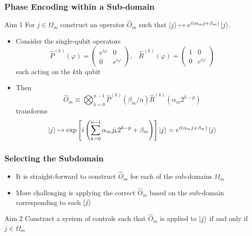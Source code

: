 \documentclass{beamer}
\begin{document}
\begin{frame}

\frametitle{Phase Encoding within a Sub-domain}

\begin{block}{Aim 1}
For $j \in \Omega_m$ construct an operator $\hat{O}_m$ such that $\ket{j} \mapsto e^{i (\alpha_m j + \beta_m )} \ket{j}$. 
\end{block}

\begin{itemize}
\item Consider the single-qubit operators 
\begin{equation}
\hat{P}^{(k)}(\varphi) = \begin{pmatrix}
e^{i \varphi} & 0 \\ 0 & e^{i \varphi}
\end{pmatrix}, \; \; \; \hat{R}^{(k)}(\varphi) = \begin{pmatrix}
1 & 0 \\ 0 & e^{i \varphi}
\end{pmatrix}
\end{equation}
each acting on the $k$th qubit
\item Then 
\begin{equation}
\hat{O}_m \equiv \bigotimes^{n-1}_{k=0} \hat{P}^{(k)} (\beta_m / n) \hat{R}^{(k)} \left( \alpha_m 2^{k-p} \right)
\end{equation}
transforms 
\begin{equation}
\ket{j} \mapsto \exp \left[ i \left( \sum_{k=0}^{n-1} \alpha_m j_k 2^{k-p} + \beta_m \right) \right] \ket{j} = e^{i (\alpha_m j + \beta_m )} \ket{j}
\end{equation}
\end{itemize}
\end{frame}

\begin{frame}
\frametitle{Selecting the Subdomain}
\begin{itemize}
\item It is straight-forward to construct $\hat{O}_m$ for each of the sub-domains $\Omega_m$ 
\item More challenging is applying the correct $\hat{O}_m$ based on the sub-domain corresponding to each $\ket{j}$
\end{itemize}
\begin{block}{Aim 2}
Construct a system of controls such that $\hat{O}_m$ is applied to $\ket{j}$ if and only if $j \in \Omega_m$
\end{block}
\end{frame}
\end{document}
